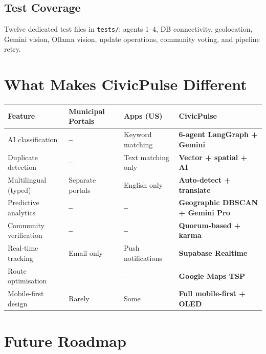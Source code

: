 \documentclass[11pt,a4paper]{article}
\newcommand{\thead}[1]{{\color{white}\bfseries\sffamily #1}}
\newcommand{\file}[1]{\texttt{\footnotesize\color{cpgray}#1}}
\begin{document}
\subsection{Test Coverage}
Twelve dedicated test files in \file{tests/}: agents 1–4, DB connectivity, geolocation, Gemini vision, Ollama vision, update operations, community voting, and pipeline retry.

\clearpage

\section{What Makes CivicPulse Different}
\label{sec:diff}

\begin{longtable}{@{} L{4cm} L{3.5cm} L{3.5cm} L{3cm} @{}}
\toprule
{}
\thead{Feature} & \thead{Municipal Portals} & \thead{311 Apps (US)} & \thead{CivicPulse} \\
\midrule
\endhead
AI classification        & \textbf{\color{cpgray}--}              & Keyword matching    & \textbf{6-agent LangGraph + Gemini} \\
Duplicate detection      & \textbf{\color{cpgray}--}              & Text matching only  & \textbf{Vector + spatial + AI} \\
Multilingual (typed)     & Separate portals & English only       & \textbf{Auto-detect + translate} \\
Predictive analytics     & \textbf{\color{cpgray}--}              & \textbf{\color{cpgray}--}                  & \textbf{Geographic DBSCAN + Gemini Pro} \\
Community verification   & \textbf{\color{cpgray}--}              & \textbf{\color{cpgray}--}                  & \textbf{Quorum-based + karma} \\
Real-time tracking       & Email only      & Push notifications  & \textbf{Supabase Realtime} \\
Route optimisation       & \textbf{\color{cpgray}--}              & \textbf{\color{cpgray}--}                  & \textbf{Google Maps TSP} \\
Mobile-first design      & Rarely          & Some                & \textbf{Full mobile-first + OLED} \\
\bottomrule
\end{longtable}

\section{Future Roadmap}
\label{sec:roadmap}
\end{document}
